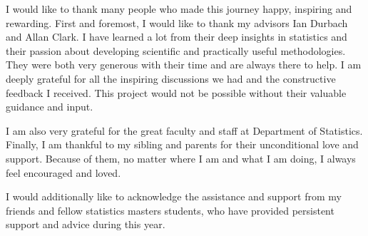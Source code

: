 \documentclass[
12pt, %
english, %
singlespacing, %
parskip, %
headsepline, %
]{MastersDoctoralThesis} %
\numberwithin{theorem}{section}
\numberwithin{remark}{section}
\numberwithin{assumption}{section}
\begin{document}
\begin{titlepage}
\begin{center}
\vfill
\end{center}
\end{titlepage}


\begin{acknowledgements}
\addchaptertocentry{\acknowledgementname} 
\vspace{1.5cm}
I would like to thank many people who made this journey happy, inspiring and rewarding. First and foremost, I would like to thank my advisors Ian Durbach and Allan Clark. I have learned a lot from their deep insights in statistics and their passion about developing scientific and practically useful methodologies.  They were both very generous with their time and are always there to help. I am deeply grateful for all the inspiring discussions we had and the constructive feedback I received. This project would not be possible without their valuable guidance and input. 

\vspace{0.3cm}

I am also very grateful for the great faculty and staff at Department of Statistics. Finally, I am thankful to my sibling and parents for their unconditional love and support. Because of them, no matter where I am and what I am doing, I always feel encouraged and loved.

\vspace{0.3cm}

I would additionally like to acknowledge the assistance and support from my friends and fellow statistics masters students, who have provided persistent support and advice during this year.

\end{acknowledgements}


\end{document}
